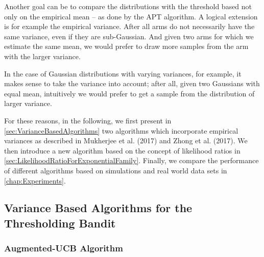 \documentclass[12pt,]{article}
\begin{document}
Another goal can be to compare the distributions with the threshold
based not only on the empirical mean -- as done by the APT algorithm. A
logical extension is for example the empirical variance. After all arms
do not necessarily have the same variance, even if they are
sub-Gaussian. And given two arms for which we estimate the same mean, we
would prefer to draw more samples from the arm with the larger variance.

In the case of Gaussian distributions with varying variances, for
example, it makes sense to take the variance into account; after all,
given two Gaussians with equal mean, intuitively we would prefer to get
a sample from the distribution of larger variance.

For these reasons, in the following, we first present in
\autoref{sec:VarianceBasedAlgorithms} two algorithms which incorporate
empirical variances as described in Mukherjee et al. (2017) and Zhong et
al. (2017). We then introduce a new algorithm based on the concept of
likelihood ratios in \autoref{sec:LikelihoodRatioForExponentialFamily}.
Finally, we compare the performance of different algorithms based on
simulations and real world data sets in \autoref{chap:Experiments}.

\subsection{\texorpdfstring{Variance Based Algorithms for the
Thresholding Bandit
\label{sec:VarianceBasedAlgorithms}}{Variance Based Algorithms for the Thresholding Bandit }}\label{variance-based-algorithms-for-the-thresholding-bandit}

\subsubsection{\texorpdfstring{Augmented-UCB Algorithm
\label{sec:AugUCBAlgorithm}}{Augmented-UCB Algorithm }}\label{augmented-ucb-algorithm}
\end{document}
